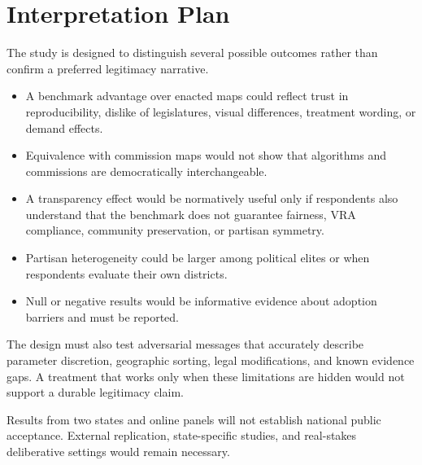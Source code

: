 \section{Interpretation Plan}
\label{sec:discussion}

The study is designed to distinguish several possible outcomes rather than
confirm a preferred legitimacy narrative.

\begin{itemize}
\item A benchmark advantage over enacted maps could reflect trust in
reproducibility, dislike of legislatures, visual differences, treatment
wording, or demand effects.
\item Equivalence with commission maps would not show that algorithms and
commissions are democratically interchangeable.
\item A transparency effect would be normatively useful only if respondents
also understand that the benchmark does not guarantee fairness, VRA
compliance, community preservation, or partisan symmetry.
\item Partisan heterogeneity could be larger among political elites or when
respondents evaluate their own districts.
\item Null or negative results would be informative evidence about adoption
barriers and must be reported.
\end{itemize}

The design must also test adversarial messages that accurately describe
parameter discretion, geographic sorting, legal modifications, and known
evidence gaps. A treatment that works only when these limitations are hidden
would not support a durable legitimacy claim.

Results from two states and online panels will not establish national public
acceptance. External replication, state-specific studies, and real-stakes
deliberative settings would remain necessary.
